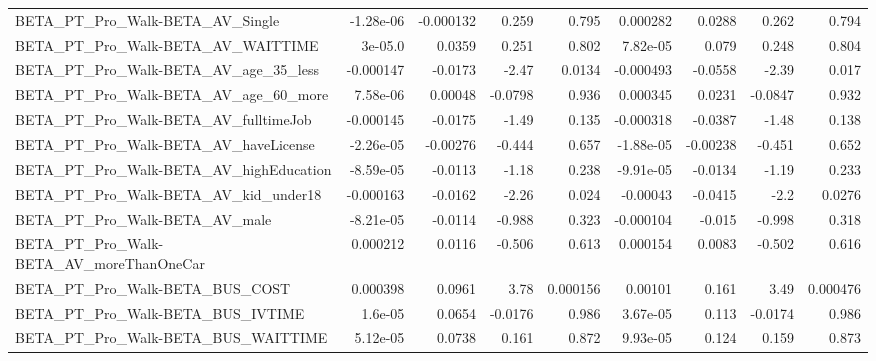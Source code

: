 \begin{tabular}{lrrrrrrrr}
BETA\_PT\_Pro\_Walk-BETA\_AV\_Single                    &   -1.28e-06 &    -0.000132 &    0.259 &    0.795 &   0.000282 &      0.0288 &        0.262 &         0.794 \\
BETA\_PT\_Pro\_Walk-BETA\_AV\_WAITTIME                  &     3e-05.0 &       0.0359 &    0.251 &    0.802 &   7.82e-05 &       0.079 &        0.248 &         0.804 \\
BETA\_PT\_Pro\_Walk-BETA\_AV\_age\_35\_less               &   -0.000147 &      -0.0173 &    -2.47 &   0.0134 &  -0.000493 &     -0.0558 &        -2.39 &         0.017 \\
BETA\_PT\_Pro\_Walk-BETA\_AV\_age\_60\_more               &    7.58e-06 &      0.00048 &  -0.0798 &    0.936 &   0.000345 &      0.0231 &      -0.0847 &         0.932 \\
BETA\_PT\_Pro\_Walk-BETA\_AV\_fulltimeJob               &   -0.000145 &      -0.0175 &    -1.49 &    0.135 &  -0.000318 &     -0.0387 &        -1.48 &         0.138 \\
BETA\_PT\_Pro\_Walk-BETA\_AV\_haveLicense               &   -2.26e-05 &     -0.00276 &   -0.444 &    0.657 &  -1.88e-05 &    -0.00238 &       -0.451 &         0.652 \\
BETA\_PT\_Pro\_Walk-BETA\_AV\_highEducation             &   -8.59e-05 &      -0.0113 &    -1.18 &    0.238 &  -9.91e-05 &     -0.0134 &        -1.19 &         0.233 \\
BETA\_PT\_Pro\_Walk-BETA\_AV\_kid\_under18               &   -0.000163 &      -0.0162 &    -2.26 &    0.024 &   -0.00043 &     -0.0415 &         -2.2 &        0.0276 \\
BETA\_PT\_Pro\_Walk-BETA\_AV\_male                      &   -8.21e-05 &      -0.0114 &   -0.988 &    0.323 &  -0.000104 &      -0.015 &       -0.998 &         0.318 \\
BETA\_PT\_Pro\_Walk-BETA\_AV\_moreThanOneCar            &    0.000212 &       0.0116 &   -0.506 &    0.613 &   0.000154 &      0.0083 &       -0.502 &         0.616 \\
BETA\_PT\_Pro\_Walk-BETA\_BUS\_COST                     &    0.000398 &       0.0961 &     3.78 & 0.000156 &    0.00101 &       0.161 &         3.49 &      0.000476 \\
BETA\_PT\_Pro\_Walk-BETA\_BUS\_IVTIME                   &     1.6e-05 &       0.0654 &  -0.0176 &    0.986 &   3.67e-05 &       0.113 &      -0.0174 &         0.986 \\
BETA\_PT\_Pro\_Walk-BETA\_BUS\_WAITTIME                 &    5.12e-05 &       0.0738 &    0.161 &    0.872 &   9.93e-05 &       0.124 &        0.159 &         0.873 \\

\end{tabular}
